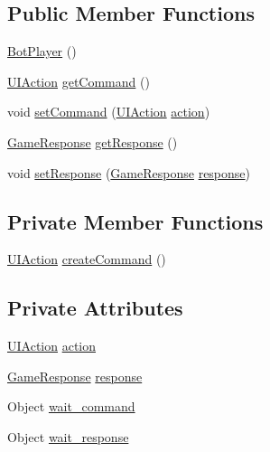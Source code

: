 \subsection*{Public Member Functions}
\begin{DoxyCompactItemize}
\item 
\mbox{\hyperlink{classplayer_1_1_bot_player_a18d916f156be305fa2f156ba8b1f78a7}{Bot\+Player}} ()
\item 
\mbox{\hyperlink{classui_1_1_u_i_action}{U\+I\+Action}} \mbox{\hyperlink{classplayer_1_1_bot_player_a811ae631a057c586488b32badd752f3c}{get\+Command}} ()
\item 
void \mbox{\hyperlink{classplayer_1_1_bot_player_a716f0bd1509ca717defac662e8a3bb27}{set\+Command}} (\mbox{\hyperlink{classui_1_1_u_i_action}{U\+I\+Action}} \mbox{\hyperlink{classplayer_1_1_bot_player_a54dbd39a17ccecad7a4fd2a20e276278}{action}})
\item 
\mbox{\hyperlink{classui_1_1_game_response}{Game\+Response}} \mbox{\hyperlink{classplayer_1_1_bot_player_a2903d1ac9d7871117d08951346b0d190}{get\+Response}} ()
\item 
void \mbox{\hyperlink{classplayer_1_1_bot_player_a4b71aed2b100f4edd770bb1a0c4f7de9}{set\+Response}} (\mbox{\hyperlink{classui_1_1_game_response}{Game\+Response}} \mbox{\hyperlink{classplayer_1_1_bot_player_a33fecf359e051c214f7ed60334972eff}{response}})
\end{DoxyCompactItemize}
\subsection*{Private Member Functions}
\begin{DoxyCompactItemize}
\item 
\mbox{\hyperlink{classui_1_1_u_i_action}{U\+I\+Action}} \mbox{\hyperlink{classplayer_1_1_bot_player_abb2afb9c7bd26eb9c4f6a586a8164230}{create\+Command}} ()
\end{DoxyCompactItemize}
\subsection*{Private Attributes}
\begin{DoxyCompactItemize}
\item 
\mbox{\hyperlink{classui_1_1_u_i_action}{U\+I\+Action}} \mbox{\hyperlink{classplayer_1_1_bot_player_a54dbd39a17ccecad7a4fd2a20e276278}{action}}
\item 
\mbox{\hyperlink{classui_1_1_game_response}{Game\+Response}} \mbox{\hyperlink{classplayer_1_1_bot_player_a33fecf359e051c214f7ed60334972eff}{response}}
\item 
Object \mbox{\hyperlink{classplayer_1_1_bot_player_a2b25f1fb370713d28c09b1f50ed8b12b}{wait\+\_\+command}}
\item 
Object \mbox{\hyperlink{classplayer_1_1_bot_player_a7107bce91cf0c994ce900a87d5bd4768}{wait\+\_\+response}}
\end{DoxyCompactItemize}


